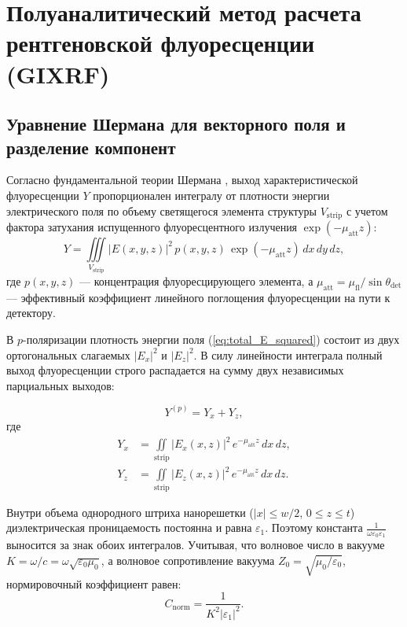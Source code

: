 \documentclass[a4paper,11pt]{article}
\begin{document}
\newpage
\section{Полуаналитический метод расчета рентгеновской флуоресценции (GIXRF)}

\subsection{Уравнение Шермана для векторного поля и разделение компонент}

Согласно фундаментальной теории Шермана \cite{sherman1955}, выход характеристической флуоресценции $Y$ пропорционален интегралу от плотности энергии электрического поля по объему светящегося элемента структуры $V_{\text{strip}}$ с учетом фактора затухания испущенного флуоресцентного излучения $\exp(-\mu_{\text{att}} z)$:
\begin{equation}
    Y = \iiint\limits_{V_{\text{strip}}} |E(x, y, z)|^2 \, p(x, y, z) \, \exp(-\mu_{\text{att}} z) \, dx \, dy \, dz,
    \label{eq:sherman_p}
\end{equation}
где $p(x, y, z)$ — концентрация флуоресцирующего элемента, а $\mu_{\text{att}} = \mu_{\text{fl}} / \sin\theta_{\text{det}}$ — эффективный коэффициент линейного поглощения флуоресценции на пути к детектору.

В $p$-поляризации плотность энергии поля (\ref{eq:total_E_squared}) состоит из двух ортогональных слагаемых $|E_x|^2$ и $|E_z|^2$. В силу линейности интеграла полный выход флуоресценции строго распадается на сумму двух независимых парциальных выходов:
\begin{mathbox}
\begin{equation}
    Y^{(p)} = Y_x + Y_z,
    \label{eq:Y_sum_components}
\end{equation}
где
\begin{align}
    Y_x &= \iint\limits_{\text{strip}} |E_x(x, z)|^2 \, e^{-\mu_{\text{att}} z} \, dx \, dz, \label{eq:Yx_def} \\[0.5em]
    Y_z &= \iint\limits_{\text{strip}} |E_z(x, z)|^2 \, e^{-\mu_{\text{att}} z} \, dx \, dz. \label{eq:Yz_def}
\end{align}
\end{mathbox}

Внутри объема однородного штриха нанорешетки ($|x| \le w/2$, $0 \le z \le t$) диэлектрическая проницаемость постоянна и равна $\varepsilon_1$. 
Поэтому константа $\frac{1}{\omega \varepsilon_0 \varepsilon_1}$ выносится за знак обоих интегралов. Учитывая, что волновое число в вакууме $K = \omega / c = \omega \sqrt{\varepsilon_0 \mu_0}$, а волновое сопротивление вакуума $Z_0 = \sqrt{\mu_0 / \varepsilon_0}$, нормировочный коэффициент равен:
\begin{equation}
    C_{\text{norm}} = \frac{1}{K^2 |\varepsilon_1|^2}.
\end{equation}
\end{document}

